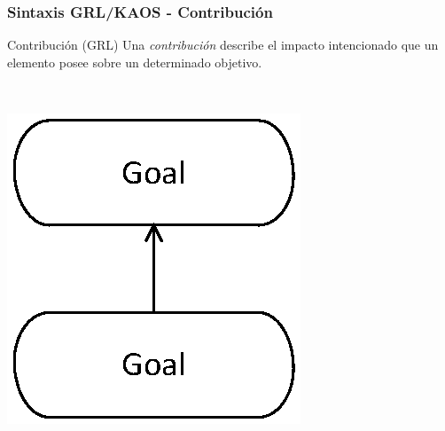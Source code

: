 \documentclass[slidestop,xcolor=pst,dvips,blue]{beamer}
\begin{document}
\begin{frame}[c]
    \frametitle{Sintaxis GRL/KAOS - Contribución}
    \begin{block}{Contribución (GRL)}
        Una \alert{\emph{contribución}} describe el impacto intencionado que un elemento posee sobre un determinado objetivo.
        \ \\
        \ \\
        \begin{columns}[c]
            \begin{column}{0.5\linewidth}
                \centering \includegraphics[width=0.35\columnwidth,keepaspectratio=true]{images/objetivos/contribution(GRL).eps}
            \end{column}
            \begin{column}{0.5\linewidth}
            \end{column}
        \end{columns}
    \end{block}
\end{frame}
\end{document}
